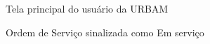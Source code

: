 \documentclass[
	article,			%
	11pt,				%
	oneside,			%
	a4paper,			%
	english,			%
	brazil,				%
	sumario=tradicional
	]{abntex2}
\begin{document}
\begin{figure}[!htbp]
 \centering
 \caption{\label{site-visao-urbam}Tela principal do usuário da URBAM}
\end{figure}

\begin{figure}[!htbp]
 \centering
 \caption{\label{site-servico-os}Ordem de Serviço sinalizada como Em serviço}
\end{figure}
\end{document}
